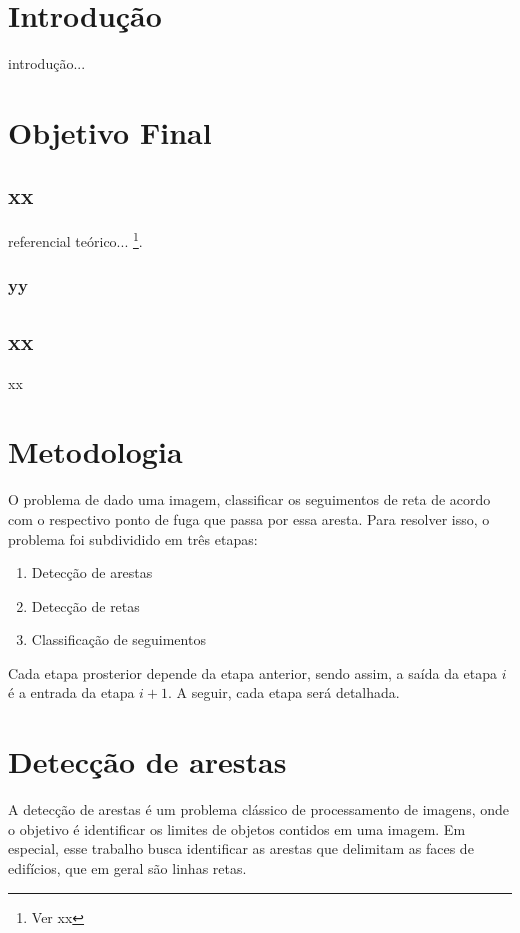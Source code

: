 \documentclass[12pt]{article}
\begin{document}
\newpage
\section{Introdução}

introdução...

\newpage
\section{Objetivo Final}

\subsection{xx}

referencial teórico... \footnote{Ver xx}.

\subsubsection{yy}

\newpage
\subsection{xx}

xx

\newpage
\section{Metodologia}

O problema de dado uma imagem, classificar os seguimentos de reta de acordo com o respectivo ponto de fuga que passa por essa aresta. Para resolver isso, o problema foi subdividido em três etapas:

\begin{enumerate}
\item Detecção de arestas
\item Detecção de retas
\item Classificação de seguimentos
\end{enumerate}

Cada etapa prosterior depende da etapa anterior, sendo assim, a saída da etapa $i$ é a entrada da etapa $i+1$. A seguir, cada etapa será detalhada.

\section{Detecção de arestas}

A detecção de arestas é um problema clássico de processamento de imagens, onde o objetivo é identificar os limites de objetos contidos em uma imagem. Em especial, esse trabalho busca identificar as arestas que delimitam as faces de edifícios, que em geral são linhas retas. 
\end{document}
